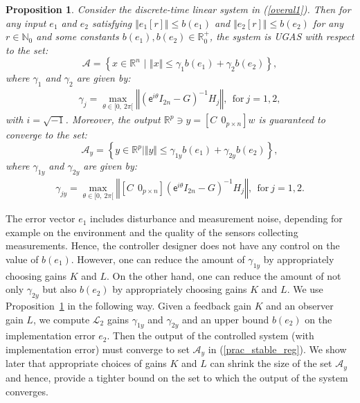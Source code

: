 \documentclass{amsart}
\newtheorem{proposition}[theorem]{Proposition}
\numberwithin{equation}{section}
\newcommand{\R}{{\mathbb{R}}}
\newcommand{\N}{{\mathbb{N}}}
\begin{document}
\begin{proposition}
\label{prac_stability1}
Consider the discrete-time linear system in (\ref{overal1}). Then for any input $e_1$ and $e_2$ satisfying $\Vert{e_1}[r]\Vert \leq b(e_1)$ and $\Vert{e_2}[r]\Vert \leq b(e_2)$ for any $r\in\N_0$ and some
constants $b(e_1),b(e_2)\in \mathbb{R}^+_0$, the system is UGAS with respect to the set:
\begin{equation}\nonumber
\mathcal{A}=\left\{x\in\R^n\,\,|\,\,\Vert{x}\Vert\leq\gamma_1b(e_1)+\gamma_2b(e_2)\right\},
\end{equation} 
where $\gamma_1$ and $\gamma_2$ are given by: 
\begin{align}\nonumber
\gamma_j=\max_{\theta\in[0,~2\pi[}\left\Vert\left(\textsf{e}^{i\theta}I_{2n}-G\right)^{-1}H_j\right\Vert,~~\text{for}~j=1,2,
\end{align}
with $i=\sqrt{-1}$. Moreover, the output $\R^p\ni y=\left[C~~0_{p\times{n}}\right]w$ is guaranteed to converge to the set:
\begin{equation}\label{prac_stable_reg}
\mathcal{A}_y=\left\{y\in\mathbb{R}^p\mid\Vert y\Vert\leq\gamma_{1y}b(e_1)+\gamma_{2y}b(e_2)\right\},
\end{equation}
where $\gamma_{1y}$ and $\gamma_{2y}$ are given by: 
\begin{align}\label{l2_gain}
\gamma_{jy}=\max_{\theta\in[0,~2\pi[}\left\Vert\left[C~~0_{p\times{n}}\right]\left(\textsf{e}^{i\theta}I_{2n}-G\right)^{-1}H_j\right\Vert,~~\text{for}~j=1,2.
\end{align}
\end{proposition}

The error vector $e_1$ includes disturbance and measurement noise, depending for example on the environment and the quality of the sensors collecting measurements. Hence, the controller designer does not have any control on the value of $b(e_1)$. However, one can reduce the amount of $\gamma_{1y}$ by appropriately choosing gains $K$ and $L$. On the other hand, one can reduce the amount of not only $\gamma_{2y}$ but also $b(e_2)$ by appropriately choosing gains $K$ and $L$. We use Proposition~\ref{prac_stability1} in the following way.
Given a feedback gain $K$ and an observer gain $L$, we compute $\mathcal{L}_2$ gains $\gamma_{1y}$ and $\gamma_{2y}$ and an upper bound $b(e_2)$ on the implementation error $e_2$. Then the output of the controlled system (with
implementation error) must converge to set $\mathcal{A}_y$ in (\ref{prac_stable_reg}).
We show later that appropriate choices of gains $K$ and $L$ can shrink the size of the 
set $\mathcal{A}_y$ and hence, provide a tighter bound on the set 
to which the output of the system converges.
\end{document}
